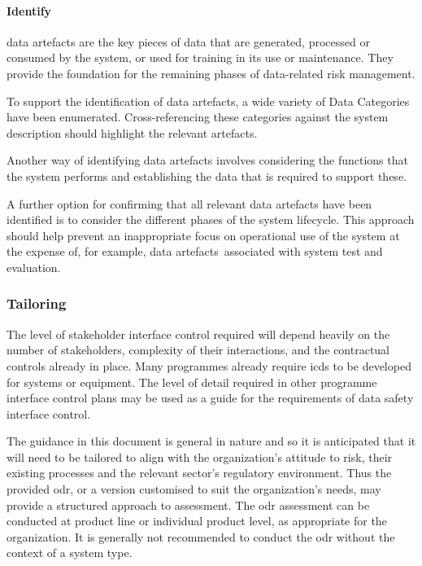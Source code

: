 \paragraph{Identify }
\Glspl{data artefact} are the key pieces of data that are generated, processed or consumed by the system, or used for training in its use or maintenance. They provide the foundation for the remaining phases of data-related risk management.

To support the identification of \glspl{data artefact}, a wide variety of Data Categories have been enumerated. Cross-referencing these categories against the system description should highlight the relevant artefacts. 

Another way of identifying \glspl{data artefact} involves considering the functions that the system performs and establishing the data that is required to support these.

A further option for confirming that all relevant \glspl{data artefact} have been identified is to consider the different phases of the system lifecycle. This approach should help prevent an inappropriate focus on operational use of the system at the expense of, for example, \cbstart\glspl{data artefact}\cbend\ associated with system test and evaluation.

\subsubsection{Tailoring}
The level of
\gls{stakeholder}
interface control required will depend heavily on the number of \glspl{stakeholder}, complexity of their interactions, and the contractual controls already in place. Many programmes already require \glspl{icd} to be developed for systems or equipment. The level of detail required in other programme interface control plans may be used as a guide for the requirements of data safety interface control. 

The guidance in this document is general in nature and so it is anticipated that it will need to be tailored to align with the organization's attitude to risk, their existing processes and the relevant sector's regulatory environment. Thus the provided \gls{odr}, or a version customised to suit the organization's needs, may provide a structured approach to assessment.
The \gls{odr} assessment can be conducted at product line or individual product level, as appropriate for the organization. It is generally not recommended to conduct the \gls{odr} without the context of a system type.

